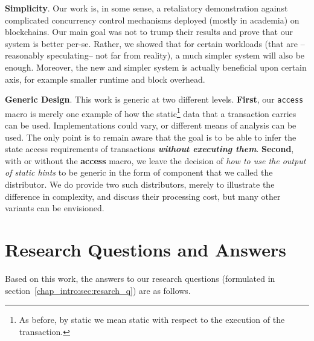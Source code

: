 \textbf{Simplicity}. Our work is, in some sense, a retaliatory demonstration against complicated
concurrency control mechanisms deployed (mostly in academia) on blockchains. Our main goal was not to
trump their results and prove that our system is better per-se. Rather, we showed that for certain
workloads (that are --reasonably speculating-- not far from reality), a much simpler system will
also be enough. Moreover, the new and simpler system is actually beneficial upon certain axis, for
example smaller runtime and block overhead.

\textbf{Generic Design}. This work is generic at two different levels. \textbf{First}, our
\texttt{access} macro is merely one example of how the static\footnote{As before, by static we mean
static with respect to the execution of the transaction.} data that a transaction carries can be
used. Implementations could vary, or different means of analysis can be used. The only point is to
remain aware that the goal is to be able to infer the state access requirements of transactions
\textit{\textbf{without executing them}}. \textbf{Second}, with or without the \textbf{access}
macro, we leave the decision of \textit{how to use the output of static hints} to be generic in the
form of component that we called the distributor. We do provide two such distributors, merely to
illustrate the difference in complexity, and discuss their processing cost, but many other variants
can be envisioned.

\section{Research Questions and Answers} \label{chap_conc:sec:rq}

Based on this work, the answers to our research questions (formulated in
section~\ref{chap_intro:sec:resarch_q}) are as follows.

